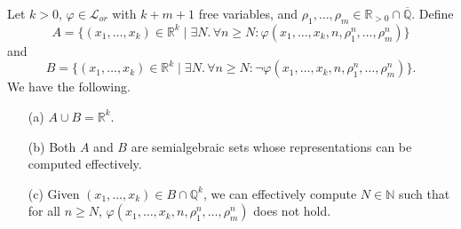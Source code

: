 \documentclass[a4paper,UKenglish,cleveref]{lipics-v2021}
\newcommand{\nat}{\mathbb{N}}
\newcommand{\rel}{\mathbb{R}}
\newcommand{\rat}{\mathbb{Q}}
\newcommand{\alg}{\overline{\rat}}
\newcommand{\Lcal}{\mathcal{L}}
\begin{document}
\begin{lemma}
	\label{thm:omin-effective}
	Let $k > 0$, $\varphi \in \Lcal_{or}$ with $k+m+1$ free variables, and $\rho_1,\ldots,\rho_m \in \rel_{>0} \cap  \alg$.
	Define
	\[
	A = \{(x_1,\ldots,x_k) \in \rel^{k} \mid \exists N.\, \forall n \ge N \colon \varphi(x_1,\ldots,x_k, n,  \rho_1^n, \ldots, \rho_m^n)\}
	\] and 
	\[
	B = \{(x_1,\ldots,x_k) \in \rel^{k} \mid \exists N.\, \forall n \ge N \colon \lnot\varphi(x_1,\ldots,x_k, n,  \rho_1^n, \ldots, \rho_m^n)\}.
	\]
	We have the following.
	\begin{enumerate}
		\item[(a)] $A \cup B = \rel^{k}$.
		\item[(b)] Both $A$ and $B$ are semialgebraic sets whose representations can be computed effectively.
		\item[(c)] Given $(x_1,\ldots,x_k )\in B \cap \rat^{k}$, we can effectively compute $N \in \nat$ such that  for all $n \ge N$, $\varphi(x_1,\ldots,x_k, n, \rho_1^n,\ldots,\rho_m^n)$ does not hold.
	\end{enumerate}
\end{lemma}
\end{document}
